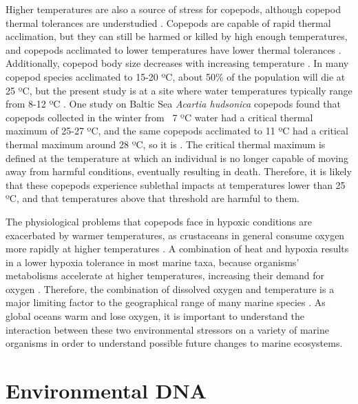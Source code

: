\documentclass[12pt,twoside]{reedthesis}
\begin{document}
Higher temperatures are also a source of stress for copepods, although copepod thermal tolerances are understudied \autocite{Sasaki2021}. Copepods are capable of rapid thermal acclimation, but they can still be harmed or killed by high enough temperatures, and copepods acclimated to lower temperatures have lower thermal tolerances \autocite{Sasaki2021, Hahn2024}.  Additionally, copepod body size decreases with increasing temperature \autocite{Hahn2024}.  In many copepod species acclimated to 15-20 ºC, about 50\% of the population will die at 25 ºC, but the present study is at a site where water temperatures typically range from 8-12 ºC \autocite{Sasaki2019, Sunar2021, Jiang2009}. One study on Baltic Sea \textit{Acartia hudsonica} copepods found that copepods collected in the winter from ~7 ºC water had a critical thermal maximum of 25-27 ºC, and the same copepods acclimated to 11 ºC had a critical thermal maximum around 28 ºC, so it is \autocite{Hahn2024}. The critical thermal maximum is defined at the temperature at which an individual is no longer capable of moving away from harmful conditions, eventually resulting in death. Therefore, it is likely that these copepods experience sublethal impacts at temperatures lower than 25 ºC, and that temperatures above that threshold are harmful to them. 

The physiological problems that copepods face in hypoxic conditions are exacerbated by warmer temperatures, as crustaceans in general consume oxygen more rapidly at higher temperatures \autocite{Vaquer-Sunyer2011}. A combination of heat and hypoxia results in a lower hypoxia tolerance in most marine taxa, because organisms' metabolisms accelerate at higher temperatures, increasing their demand for oxygen \autocite{Deutsch2024}. Therefore, the combination of dissolved oxygen and temperature is a major limiting factor to the geographical range of many marine species \autocite{Deutsch2015, Deutsch2020}. As global oceans warm and lose oxygen, it is important to understand the interaction between these two environmental stressors on a variety of marine organisms in order to understand possible future changes to marine ecosystems.

\clearpage 

\section{Environmental DNA}\label{IntroeDNA}


\end{document}
